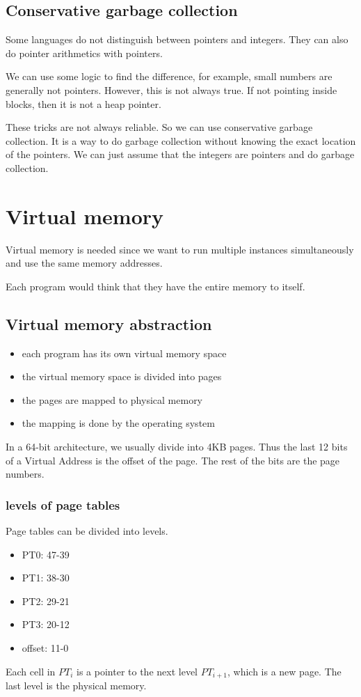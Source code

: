 \documentclass[letterpaper,12pt]{article}
\begin{document}
\subsection{Conservative garbage collection}
Some languages do not distinguish between pointers and integers. They can also
do pointer arithmetics with pointers.

We can use some logic to find the difference, for example, small numbers are
generally not pointers. However, this is not always true. If not pointing
inside blocks, then it is not a heap pointer.

These tricks are not always reliable. So we can use conservative garbage
collection. It is a way to do garbage collection without knowing the exact
location of the pointers. We can just assume that the integers are pointers and
do garbage collection.
\section{Virtual memory}
Virtual memory is needed since we want to run multiple instances simultaneously
and use the same memory addresses.

Each program would think that they have the entire memory to itself.
\subsection{Virtual memory abstraction}
\begin{itemize}
    \item each program has its own virtual memory space
    \item the virtual memory space is divided into pages
    \item the pages are mapped to physical memory
    \item the mapping is done by the operating system
\end{itemize}
In a 64-bit architecture, we usually divide into 4KB pages. Thus the last 12 bits of a Virtual Address is the offset of the page. The rest of the bits are the page numbers.

\subsubsection{levels of page tables}
Page tables can be divided into levels.

\begin{itemize}
    \item PT0: 47-39
    \item PT1: 38-30
    \item PT2: 29-21
    \item PT3: 20-12
    \item offset: 11-0
\end{itemize}
Each cell in $PT_i$ is a pointer to the next level $PT_{i+1}$, which is a new page. The last level is the physical memory.
\end{document}
